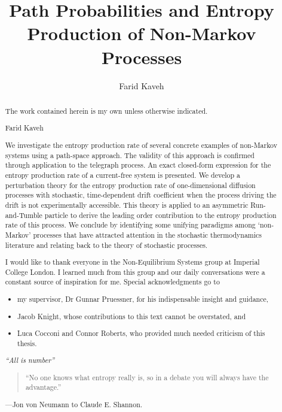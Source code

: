 \documentclass[a4paper, twoside, colorlinks=true, allcolors=blue]{article}
\title{Path Probabilities and Entropy Production of Non-Markov Processes}
\author{Farid Kaveh}
\numberwithin{equation}{section}
\begin{document}

\renewcommand{\abstractname}{\normalsize Declaration}
\begin{abstract}\normalsize
    The work contained herein is my own unless otherwise indicated. 
    
    
    
    \vspace{1cm}
    \quad \quad Farid Kaveh
\end{abstract}
\newpage
\renewcommand{\abstractname}{\normalsize Abstract}
\begin{abstract}\normalsize 
We investigate the entropy production rate of several concrete examples of non-Markov systems using a path-space approach. The validity of this approach is confirmed through application to the telegraph process. An exact closed-form expression for the entropy production rate of a current-free system is presented. We develop a perturbation theory for the entropy production rate of one-dimensional diffusion processes with stochastic, time-dependent drift coefficient when the process driving the drift is not experimentally accessible. This theory is applied to an asymmetric Run-and-Tumble particle to derive the leading order contribution to the entropy production rate of this process. We conclude by identifying some unifying paradigms among `non-Markov' processes that have attracted attention in the stochastic thermodynamics literature and relating back to the theory of stochastic processes. 
\end{abstract}
\newpage
\renewcommand{\abstractname}{\normalsize Acknowledgements}
\begin{abstract}\normalsize
I would like to thank everyone in the Non-Equilibrium Systems group at Imperial College London. I learned much from this group and our daily conversations were a constant source of inspiration for me. Special acknowledgments go to

\begin{itemize}
\item my supervisor, Dr Gunnar Pruessner, for his indispensable insight and guidance, 
\item Jacob Knight, whose contributions to this text cannot be overstated, and 
\item Luca Cocconi and Connor Roberts, who provided much needed criticism of this thesis. 
\end{itemize}
\end{abstract}
\newpage
\renewcommand{\abstractname}{\normalsize Dedication}
\begin{abstract}\normalsize
\vspace{3cm}
\textit{``All is number''} 
\vspace{2cm}


\begin{quote}
``No one knows what entropy
really is, so in a debate you will always
have the advantage.''
\end{quote}

\hfill ---Jon von Neumann to Claude E. Shannon.
\end{abstract}
\newpage
\end{document}
